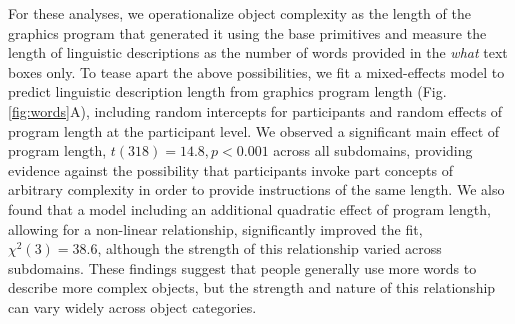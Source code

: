 \documentclass[10pt,letterpaper]{article}
\begin{document}

For these analyses, we operationalize object complexity as the length of the graphics program that generated it using the base primitives and measure the length of linguistic descriptions as the number of words provided in the \textit{what} text boxes only.
To tease apart the above possibilities, we fit a mixed-effects model to predict linguistic description length from graphics program length (Fig. \ref{fig:words}A), including random intercepts for participants and random effects of program length at the participant level.
We observed a significant main effect of program length, $t(318)=14.8, p < 0.001$ across all subdomains, providing evidence against the possibility that participants invoke part concepts of arbitrary complexity in order to provide instructions of the same length. 
We also found that a model including an additional quadratic effect of program length, allowing for a non-linear relationship, significantly improved the fit, $\chi^2(3)=38.6$, although the strength of this relationship varied across subdomains.
These findings suggest that people generally use more words to describe more complex objects, but the strength and nature of this relationship can vary widely across object categories. 

\end{document}
